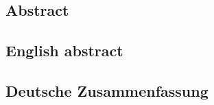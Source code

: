 \documentclass[
	a4paper,
	english,
	twoside,
	openright,               
	11pt                            
	]{report}
\begin{document}
\begin{appendices}

\chapter{Abstract} %
\label{cha:abstract}

\section{English abstract} %
\label{sec:english_abstract}



\newpage

\section{Deutsche Zusammenfassung} %
\label{sec:deutsche_zusammenfassung}








% 
% 
% 

\end{appendices}

\cleardoublepage

 



\printglossaries
\end{document}
